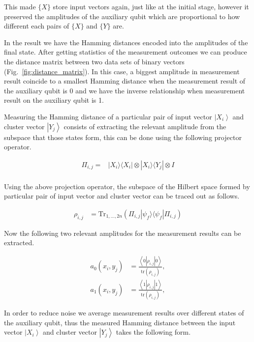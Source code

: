 \documentclass[pra,showkeys,twocolumn,showpacs]{revtex4-1}
\begin{document}
This made $\{X\}$ store input vectors again, just like at the initial stage, 
however it preserved the amplitudes of the auxiliary qubit which are proportional to how different each pairs of $\{X\}$ and $\{Y\}$ are.

In the result we have the Hamming distances encoded into the amplitudes of the final state. 
After getting statistics of the measurement outcomes we can produce the distance matrix between two data sets of binary vectors (Fig.~\ref{fig:distance_matrix}). 
In this case, a biggest amplitude in measurement result coincide to a smallest Hamming distance when the measurement result of the auxiliary qubit is 0 and 
we have the inverse relationship when measurement result on the auxiliary qubit is 1.

Measuring the Hamming distance of a particular pair of input vector $\left| X_i \right\rangle$ and cluster vector $\left| Y_j \right\rangle$ consists of extracting the relevant amplitude from the subspace that those states form, this can be done using the following projector operator.

\begin{align}
\Pi_{i,j} = &\left| X_i \rangle\langle X_i \right| \otimes \left| X_i \rangle\langle Y_j \right| \otimes I \nonumber \\ 
\end{align} 

Using the above projection operator, the subspace of the Hilbert space formed by particular pair of input vector and cluster vector can be traced out as follows.

\begin{align}
    \rho_{i,j} &= \text{Tr}_{1,\dots,2n} (\Pi_{i,j} \left| \psi_f \rangle\langle \psi_f \right| \Pi_{i,j})
\end{align}

Now the following two relevant amplitudes for the measurement results can be extracted.

\begin{align}
    a_0(x_i,y_j) & = \frac{\left\langle 0 |\rho_{i,j}| 0 \right\rangle}{\text{tr}(\rho_{i,j})},  \\
    a_1(x_i,y_j) & = \frac{\left\langle 1 |\rho_{i,j}| 1 \right\rangle}{\text{tr}(\rho_{i,j})},
\end{align}

In order to reduce noise we average measurement results over different states of the auxiliary qubit, 
thus the measured Hamming distance between the input vector $\left| X_i \right\rangle$ and cluster vector $\left| Y_j \right\rangle$ takes the following form.
\end{document}
